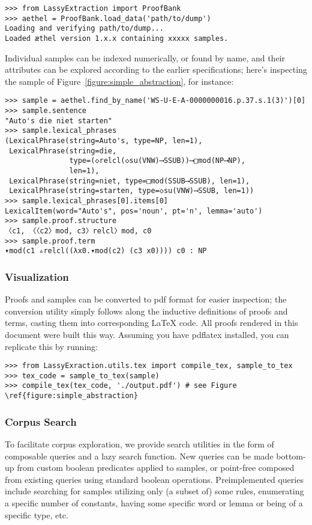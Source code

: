 \begin{verbatim}
>>> from LassyExtraction import ProofBank
>>> aethel = ProofBank.load_data('path/to/dump')
Loading and verifying path/to/dump...
Loaded æthel version 1.x.x containing xxxxx samples.
\end{verbatim}

\noindent Individual samples can be indexed numerically, or found by name, and their attributes can be explored according to the earlier specifications; here's inspecting the sample of Figure~\ref{figure:simple_abstraction}, for instance:

\begin{verbatim}
>>> sample = aethel.find_by_name('WS-U-E-A-0000000016.p.37.s.1(3)')[0]
>>> sample.sentence
"Auto's die niet starten"
>>> sample.lexical_phrases
(LexicalPhrase(string=Auto's, type=NP, len=1),
 LexicalPhrase(string=die, 
               type=(◇relcl(◇su(VNW)⟶SSUB))⟶□mod(NP⟶NP), 
               len=1),
 LexicalPhrase(string=niet, type=□mod(SSUB⟶SSUB), len=1),
 LexicalPhrase(string=starten, type=◇su(VNW)⟶SSUB, len=1))
>>> sample.lexical_phrases[0].items[0]
LexicalItem(word="Auto's", pos='noun', pt='n', lemma='auto')
>>> sample.proof.structure
〈c1, 〈〈c2〉mod, c3〉relcl〉mod, c0
>>> sample.proof.term
▾mod(c1 ▵relcl((λx0.▾mod(c2) (c3 x0)))) c0 : NP
\end{verbatim}

\subsubsection{Visualization}
Proofs and samples can be converted to pdf format for easier inspection; the conversion utility simply follows along the inductive definitions of proofs and terms, casting them into corresponding \LaTeX{} code.
All proofs rendered in this document were built this way.
Assuming you have pdflatex installed, you can replicate this by running:
\begin{verbatim}
>>> from LassyExraction.utils.tex import compile_tex, sample_to_tex
>>> tex_code = sample_to_tex(sample)
>>> compile_tex(tex_code, './output.pdf') # see Figure \ref{figure:simple_abstraction}
\end{verbatim}

\subsubsection{Corpus Search}
To facilitate corpus exploration, we provide search utilities in the form of composable queries and a lazy search function.
New queries can be made bottom-up from custom boolean predicates applied to samples, or point-free composed from existing queries using standard boolean operations.
Preimplemented queries include searching for samples utilizing only (a subset of) some rules, enumerating a specific number of constants, having some specific word or lemma or being of a specific type, etc.

